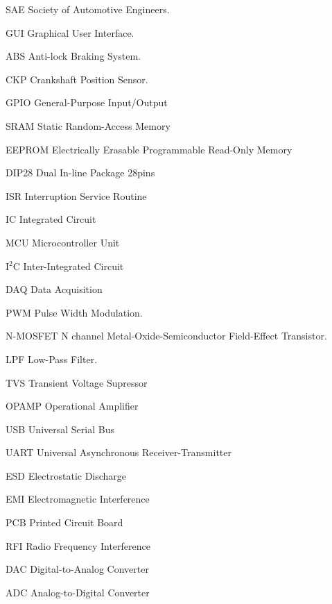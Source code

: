 \begin{siglas}
  \item[SAE] Society of Automotive Engineers.
  \item[GUI] Graphical User Interface.
  \item[ABS] Anti-lock Braking System.
  \item[CKP] Crankshaft Position Sensor.
  \item[GPIO] General-Purpose Input/Output
  \item[SRAM] Static Random-Access Memory
  \item[EEPROM] Electrically Erasable Programmable Read-Only Memory
  \item[DIP28] Dual In-line Package 28pins
  \item[ISR] Interruption Service Routine
  \item[IC] Integrated Circuit
  \item[MCU] Microcontroller Unit
  \item[I$^2$C] Inter-Integrated Circuit
  \item[DAQ] Data Acquisition
  \item[PWM] Pulse Width Modulation.
  \item[N-MOSFET] N channel Metal-Oxide-Semiconductor Field-Effect Transistor.
  \item[LPF] Low-Pass Filter.
  \item[TVS] Transient Voltage Supressor
  \item[OPAMP] Operational Amplifier
  \item[USB] Universal Serial Bus
  \item[UART] Universal Asynchronous Receiver-Transmitter
  \item[ESD] Electrostatic Discharge
  \item[EMI] Electromagnetic Interference
  \item[PCB] Printed Circuit Board
  \item[RFI] Radio Frequency Interference
  \item[DAC] Digital-to-Analog Converter
  \item[ADC] Analog-to-Digital Converter
\end{siglas}
